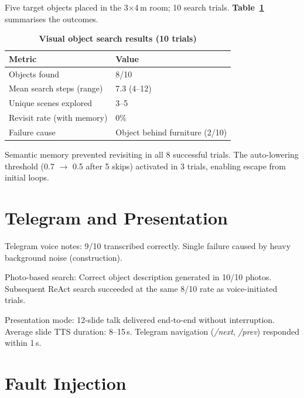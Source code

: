 Five target objects placed in the 3$\times$4\,m room; 10 search trials. \textbf{Table~\ref{tab:search_results}} summarises the outcomes.

\begin{table}[H]
\centering
\caption[Visual object search results (10 trials)]{\textbf{Visual object search results (10 trials)}}
\label{tab:search_results}
\begin{tabularx}{\textwidth}{|>{\raggedright\arraybackslash}p{4.5cm}|X|}
\hline
\textbf{Metric} & \textbf{Value} \\
\hline
Objects found & 8/10 \\
\hline
Mean search steps (range) & 7.3 (4--12) \\
\hline
Unique scenes explored & 3--5 \\
\hline
Revisit rate (with memory) & 0\% \\
\hline
Failure cause & Object behind furniture (2/10) \\
\hline
\end{tabularx}
\end{table}

Semantic memory prevented revisiting in all 8 successful trials. The auto-lowering threshold (0.7 $\to$ 0.5 after 5 skips) activated in 3 trials, enabling escape from initial loops.

\section{Telegram and Presentation}
\label{sec:telegram_results}

Telegram voice notes: 9/10 transcribed correctly. Single failure caused by heavy background noise (construction).

Photo-based search: Correct object description generated in 10/10 photos. Subsequent ReAct search succeeded at the same 8/10 rate as voice-initiated trials.

Presentation mode: 12-slide talk delivered end-to-end without interruption. Average slide TTS duration: 8--15\,s. Telegram navigation (\textit{/next}, \textit{/prev}) responded within 1\,s.

\section{Fault Injection}
\label{sec:fault_results}

